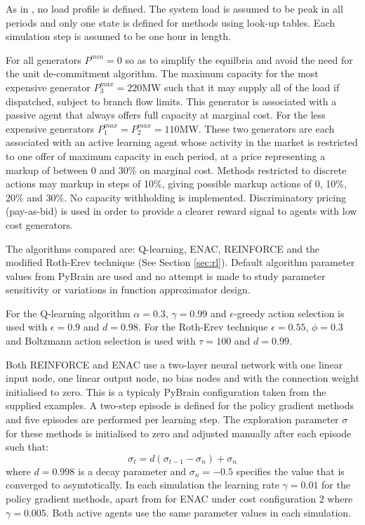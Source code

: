 As in , no load profile is defined. The
system load is assumed to be peak in all periods and only one state is defined
for methods using look-up tables.  Each simulation step is assumed to be one
hour in length.

For all generators $P^{min}=0$ so as to simplify the equilbria and avoid the
need for the unit de-commitment algorithm.  The maximum capacity for the most
expensive generator $P^{max}_3=220$MW such that it may supply all of the
load if dispatched, subject to branch flow limits.  This generator is
associated with a passive agent that always offers full capacity at marginal cost.  For the less expensive generators
$P^{max}_1=P^{max}_2=110$MW.  These two generators are each associated with an
active learning agent whose activity in the market is restricted to one offer of
maximum capacity in each period, at a price representing a markup of between 0
and 30\% on marginal cost.  Methods restricted to discrete actions may markup in
steps of 10\%, giving possible markup actions of 0, 10\%, 20\% and 30\%.  No
capacity withholding is implemented.
Discriminatory pricing (pay-as-bid) is used in order to provide a clearer reward
signal to agents with low cost generators.

The algorithms compared are: Q-learning, ENAC, REINFORCE and the modified
Roth-Erev technique (See Section \ref{sec:rl}). Default algorithm parameter
values from PyBrain are used and no attempt is made to study parameter
sensitivity or variations in function approximator design.

For the Q-learning algorithm $\alpha=0.3$, $\gamma=0.99$ and $\epsilon$-greedy
action selection is used with $\epsilon=0.9$ and $d=0.98$.  For the Roth-Erev
technique $\epsilon=0.55$, $\phi=0.3$ and Boltzmann action selection is used
with $\tau=100$ and $d=0.99$.

Both REINFORCE and ENAC use a two-layer neural network with one linear input
node, one linear output node, no bias nodes and with the connection weight
initialised to zero.  This is a typicaly PyBrain configuration taken from the
supplied examples. A two-step episode is defined for the policy gradient methods
and five episodes are performed per learning step.  The exploration parameter
$\sigma$ for these methods is initialised to zero and adjusted manually after
each episode such that:
\begin{equation}
\label{eq:sigmadecay}
\sigma_{t} = d(\sigma_{t-1}-\sigma_{n})+\sigma_{n}
\end{equation}
where $d=0.998$ is a decay parameter and $\sigma_{n}=-0.5$ specifies the
value that is converged to asymtotically.  In each simulation the learning rate
$\gamma=0.01$ for the policy gradient methods, apart from for ENAC under cost
configuration 2 where $\gamma=0.005$.  Both active agents use the same
parameter values in each simulation.

